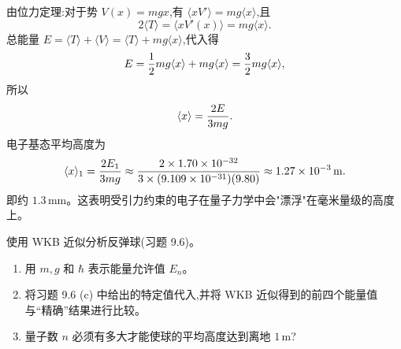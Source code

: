 \begin{solution}
由位力定理:对于势 $V(x)=mgx$,有 $\langle xV'\rangle=mg\langle x\rangle$,且
\[
2\langle T\rangle=\langle xV'(x)\rangle=mg\langle x\rangle.
\]
总能量 $E=\langle T\rangle+\langle V\rangle=\langle T\rangle+mg\langle x\rangle$,代入得
\[
E={1\over2}mg\langle x\rangle+mg\langle x\rangle={3\over2}mg\langle x\rangle,
\]
所以
\[
\langle x\rangle={2E\over3mg}.
\]
电子基态平均高度为
\[
\langle x\rangle_1={2E_1\over3mg}
\approx{2\times1.70\times10^{-32}\over3\times(9.109\times10^{-31})(9.80)}
\approx 1.27\times10^{-3}\,\mathrm{m}.
\]
即约 $1.3\,\mathrm{mm}$。这表明受引力约束的电子在量子力学中会"漂浮"在毫米量级的高度上。
\end{solution}

\begin{question}
使用 WKB 近似分析反弹球(习题 9.6)。
\begin{enumerate}
\item 用 $m,g$ 和 $\hbar$ 表示能量允许值 $E_n$。
\item 将习题 9.6 (c) 中给出的特定值代入,并将 WKB 近似得到的前四个能量值与“精确”结果进行比较。
\item 量子数 $n$ 必须有多大才能使球的平均高度达到离地 $1\,\mathrm{m}$?
\end{enumerate}
\end{question}
